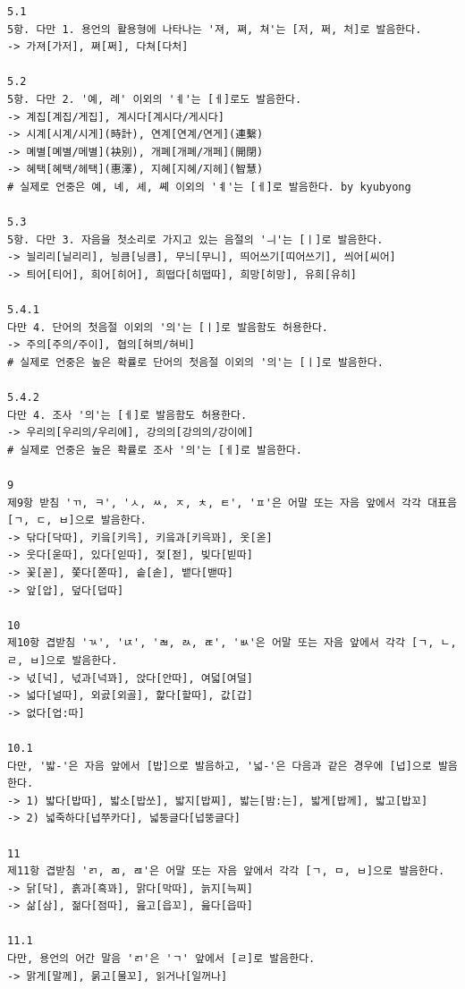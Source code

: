 \documentclass[letterpaper]{article} %
\begin{document}
\begin{verbatim}
5.1
5항. 다만 1. 용언의 활용형에 나타나는 '져, 쪄, 쳐'는 [저, 쩌, 처]로 발음한다.
-> 가져[가저], 쪄[쩌], 다쳐[다처]

5.2
5항. 다만 2. '예, 례' 이외의 'ㅖ'는 [ㅔ]로도 발음한다.
-> 계집[계집/게집], 계시다[계시다/게시다]
-> 시계[시계/시게](時計), 연계[연계/연게](連繫)
-> 몌별[몌별/메별](袂別), 개폐[개폐/개페](開閉)
-> 혜택[혜택/헤택](惠澤), 지혜[지혜/지헤](智慧)
# 실제로 언중은 예, 녜, 셰, 쎼 이외의 'ㅖ'는 [ㅔ]로 발음한다. by kyubyong

5.3
5항. 다만 3. 자음을 첫소리로 가지고 있는 음절의 'ㅢ'는 [ㅣ]로 발음한다.
-> 늴리리[닐리리], 닁큼[닝큼], 무늬[무니], 띄어쓰기[띠어쓰기], 씌어[씨어]
-> 틔어[티어], 희어[히어], 희떱다[히떱따], 희망[히망], 유희[유히]

5.4.1
다만 4. 단어의 첫음절 이외의 '의'는 [ㅣ]로 발음함도 허용한다.
-> 주의[주의/주이], 협의[혀븨/혀비]
# 실제로 언중은 높은 확률로 단어의 첫음절 이외의 '의'는 [ㅣ]로 발음한다.

5.4.2
다만 4. 조사 '의'는 [ㅔ]로 발음함도 허용한다.
-> 우리의[우리의/우리에], 강의의[강의의/강이에]
# 실제로 언중은 높은 확률로 조사 '의'는 [ㅔ]로 발음한다.

9
제9항 받침 'ㄲ, ㅋ', 'ㅅ, ㅆ, ㅈ, ㅊ, ㅌ', 'ㅍ'은 어말 또는 자음 앞에서 각각 대표음 [ㄱ, ㄷ, ㅂ]으로 발음한다.
-> 닦다[닥따], 키읔[키윽], 키읔과[키윽꽈], 옷[옫]
-> 웃다[욷따], 있다[읻따], 젖[젇], 빚다[빋따]
-> 꽃[꼳], 쫓다[쫃따], 솥[솓], 뱉다[밷따]
-> 앞[압], 덮다[덥따]

10
제10항 겹받침 'ㄳ', 'ㄵ', 'ㄼ, ㄽ, ㄾ', 'ㅄ'은 어말 또는 자음 앞에서 각각 [ㄱ, ㄴ, ㄹ, ㅂ]으로 발음한다.
-> 넋[넉], 넋과[넉꽈], 앉다[안따], 여덟[여덜]
-> 넓다[널따], 외곬[외골], 핥다[할따], 값[갑]
-> 없다[업:따]

10.1
다만, '밟-'은 자음 앞에서 [밥]으로 발음하고, '넓-'은 다음과 같은 경우에 [넙]으로 발음한다.
-> 1) 밟다[밥따], 밟소[밥쏘], 밟지[밥찌], 밟는[밤:는], 밟게[밥께], 밟고[밥꼬]
-> 2) 넓죽하다[넙쭈카다], 넓둥글다[넙뚱글다]

11
제11항 겹받침 'ㄺ, ㄻ, ㄿ'은 어말 또는 자음 앞에서 각각 [ㄱ, ㅁ, ㅂ]으로 발음한다.
-> 닭[닥], 흙과[흑꽈], 맑다[막따], 늙지[늑찌]
-> 삶[삼], 젊다[점따], 읊고[읍꼬], 읊다[읍따]

11.1
다만, 용언의 어간 말음 'ㄺ'은 'ㄱ' 앞에서 [ㄹ]로 발음한다.
-> 맑게[말께], 묽고[물꼬], 읽거나[일꺼나]


\end{verbatim}
\end{document}
